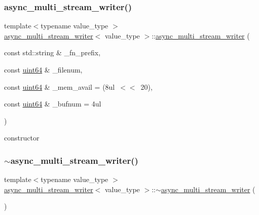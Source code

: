 \subsubsection{\texorpdfstring{async\+\_\+multi\+\_\+stream\+\_\+writer()}{async\_multi\_stream\_writer()}}
{\footnotesize\ttfamily template$<$typename value\+\_\+type $>$ \\
\hyperlink{classasync__multi__stream__writer}{async\+\_\+multi\+\_\+stream\+\_\+writer}$<$ value\+\_\+type $>$\+::\hyperlink{classasync__multi__stream__writer}{async\+\_\+multi\+\_\+stream\+\_\+writer} (\begin{DoxyParamCaption}\item[{const std\+::string \&}]{\+\_\+fn\+\_\+prefix,  }\item[{const \hyperlink{types_8h_a60e8696a4678cd348e991a1f172e53f7}{uint64} \&}]{\+\_\+filenum,  }\item[{const \hyperlink{types_8h_a60e8696a4678cd348e991a1f172e53f7}{uint64} \&}]{\+\_\+mem\+\_\+avail = {\ttfamily (8ul~$<$$<$~20)},  }\item[{const \hyperlink{types_8h_a60e8696a4678cd348e991a1f172e53f7}{uint64} \&}]{\+\_\+bufnum = {\ttfamily 4ul} }\end{DoxyParamCaption})\hspace{0.3cm}{\ttfamily [inline]}}



constructor 

\mbox{\label{classasync__multi__stream__writer_a26ace952cb25e9ec4a0839d0aafc5e5e}} 
\subsubsection{\texorpdfstring{$\sim$async\+\_\+multi\+\_\+stream\+\_\+writer()}{~async\_multi\_stream\_writer()}}
{\footnotesize\ttfamily template$<$typename value\+\_\+type $>$ \\
\hyperlink{classasync__multi__stream__writer}{async\+\_\+multi\+\_\+stream\+\_\+writer}$<$ value\+\_\+type $>$\+::$\sim$\hyperlink{classasync__multi__stream__writer}{async\+\_\+multi\+\_\+stream\+\_\+writer} (\begin{DoxyParamCaption}{ }\end{DoxyParamCaption})\hspace{0.3cm}{\ttfamily [inline]}}



